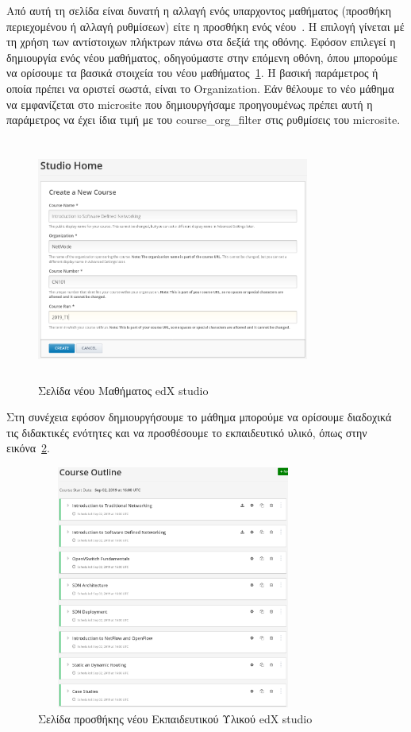 \documentclass[12pt]{report}
\begin{document}
Από αυτή τη σελίδα είναι δυνατή η αλλαγή ενός υπαρχοντος μαθήματος (προσθήκη περιεχομένου ή αλλαγή ρυθμίσεων) είτε η προσθήκη ενός νέου~\cite{edxdata_package_2}. Η επιλογή γίνεται μέ τη χρήση των αντίστοιχων πλήκτρων πάνω στα δεξίά της οθόνης. Εφόσον επιλεγεί η δημιουργία ενός νέου μαθήματος, οδηγούμαστε στην επόμενη οθόνη, όπου μπορούμε να ορίσουμε τα βασικά στοιχεία του νέου μαθήματος~\ref{fig:edx-studio-new-course}. Η βασική παράμετρος ή οποία πρέπει να οριστεί σωστά, είναι το \textlatin{Organization}. Εάν θέλουμε το νέο μάθημα να εμφανίζεται στο \textlatin{microsite} που δημιουργήσαμε προηγουμένως πρέπει αυτή η παράμετρος να έχει ίδια τιμή με του \textlatin{course\_org\_filter} στις ρυθμίσεις του \textlatin{microsite}.
\begin{figure}[h]
\centering
\includegraphics[width=0.8\textwidth, height=8cm]{edx-studio-new-course}
\caption{Σελίδα νέου Μαθήματος \textlatin{edX studio}}
\label{fig:edx-studio-new-course}
\end{figure}

Στη συνέχεια εφόσον δημιουργήσουμε το μάθημα μπορούμε να ορίσουμε διαδοχικά τις διδακτικές ενότητες και να προσθέσουμε το εκπαιδευτικό υλικό, όπως στην εικόνα~\ref{fig:edx-studio-course-outline}.
\begin{figure}[h]
\centering
\includegraphics[width=0.8\textwidth, height=8cm]{edx-studio-course-outline}
\caption{Σελίδα προσθήκης νέου Εκπαιδευτικού Υλικού \textlatin{edX studio}}
\label{fig:edx-studio-course-outline}
\end{figure}
\end{document}
